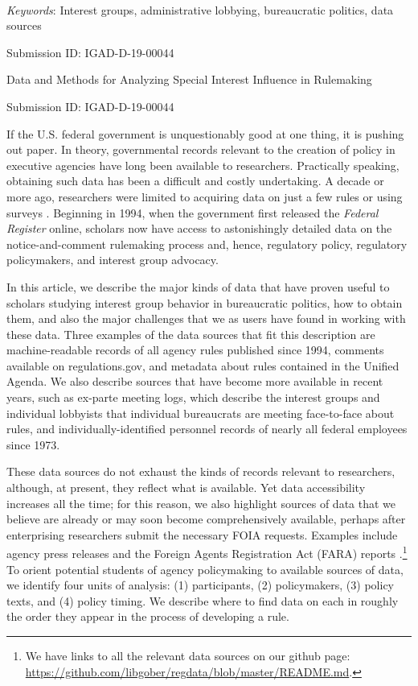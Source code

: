 \documentclass[12pt,notitlepage]{article}
\newcounter{cor}
\begin{document}
	          \hfill \\ 
      \noindent \emph{Keywords}: Interest groups, administrative lobbying, bureaucratic politics, data
sources 
    	
	Submission ID: IGAD-D-19-00044
	\thispagestyle{empty}
	
	\newpage
	\clearpage
	
	\doublespacing
	
	Data and Methods for Analyzing Special Interest Influence in Rulemaking
	
	\noindent Submission ID: IGAD-D-19-00044

If the U.S. federal government is unquestionably good at one thing, it
is pushing out paper. In theory, governmental records relevant to the
creation of policy in executive agencies have long been available to
researchers. Practically speaking, obtaining such data has been a
difficult and costly undertaking. A decade or more ago, researchers were
limited to acquiring data on just a few rules
\citep[e.g.,][]{Golden_JPART_1998} or using surveys
\citep[e.g.,][]{Furlong_JPART_2004}. Beginning in 1994, when the
government first released the \emph{Federal Register} online, scholars
now have access to astonishingly detailed data on the notice-and-comment
rulemaking process and, hence, regulatory policy, regulatory
policymakers, and interest group advocacy.

In this article, we describe the major kinds of data that have proven
useful to scholars studying interest group behavior in bureaucratic
politics, how to obtain them, and also the major challenges that we as
users have found in working with these data. Three examples of the data
sources that fit this description are machine-readable records of all
agency rules published since 1994, comments available on
regulations.gov, and metadata about rules contained in the Unified
Agenda. We also describe sources that have become more available in
recent years, such as ex-parte meeting logs, which describe the interest
groups and individual lobbyists that individual bureaucrats are meeting
face-to-face about rules, and individually-identified personnel records
of nearly all federal employees since 1973.

These data sources do not exhaust the kinds of records relevant to
researchers, although, at present, they reflect what is available. Yet
data accessibility increases all the time; for this reason, we also
highlight sources of data that we believe are already or may soon become
comprehensively available, perhaps after enterprising researchers submit
the necessary FOIA requests. Examples include agency press releases
\citep[see e.g.,][]{Libgober_JOP, Libgober_2018} and the Foreign Agents
Registration Act (FARA) reports \citep{Shepherd_APSR_2019}.\footnote{We
  have links to all the relevant data sources on our github page:
  \url{https://github.com/libgober/regdata/blob/master/README.md}.} To
orient potential students of agency policymaking to available sources of
data, we identify four units of analysis: (1) participants, (2)
policymakers, (3) policy texts, and (4) policy timing. We describe where
to find data on each in roughly the order they appear in the process of
developing a rule.
\end{document}
